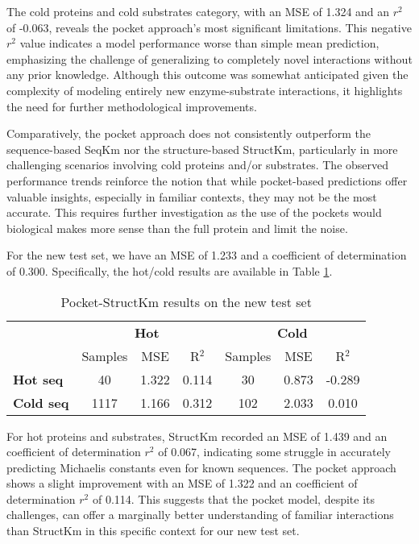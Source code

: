 The cold proteins and cold substrates category, with an MSE of 1.324 and an $r^2$ of -0.063, reveals the pocket approach's most significant limitations. This negative $r^2$ value indicates a model performance worse than simple mean prediction, emphasizing the challenge of generalizing to completely novel interactions without any prior knowledge. Although this outcome was somewhat anticipated given the complexity of modeling entirely new enzyme-substrate interactions, it highlights the need for further methodological improvements.
 
Comparatively, the pocket approach does not consistently outperform the sequence-based SeqKm nor the structure-based StructKm, particularly in more challenging scenarios involving cold proteins and/or substrates. The observed performance trends reinforce the notion that while pocket-based predictions offer valuable insights, especially in familiar contexts, they may not be the most accurate. This requires further investigation as the use of the pockets would biological makes more sense than the full protein and limit the noise.

For the new test set, we have an MSE of 1.233 and a coefficient of determination of 0.300. Specifically, the hot/cold results are available in Table \ref{tab:results_pocket_new_test}.

\begin{table}[ht]
  \centering
  \begin{tabular}{lcccccc}
  \hline
   & \multicolumn{3}{c}{\textbf{Hot}} & \multicolumn{3}{c}{\textbf{Cold}} \\
   & Samples & MSE & R\(^2\) & Samples & MSE & R\(^2\) \\ \hline
  \textbf{Hot seq}  & 40 & 1.322 & 0.114 & 30 & 0.873 & -0.289 \\
  \textbf{Cold seq}& 1117 & 1.166 & 0.312 & 102 & 2.033 & 0.010 \\ \hline
  \end{tabular}
  \caption{Pocket-StructKm results on the new test set}
  \label{tab:results_pocket_new_test}
 \end{table}

For hot proteins and substrates, StructKm recorded an MSE of 1.439 and an coefficient of determination $r^2$ of 0.067, indicating some struggle in accurately predicting Michaelis constants even for known sequences. The pocket approach shows a slight improvement with an MSE of 1.322 and an coefficient of determination $r^2$ of 0.114. This suggests that the pocket model, despite its challenges, can offer a marginally better understanding of familiar interactions than StructKm in this specific context for our new test set.

